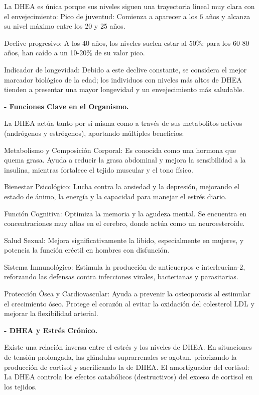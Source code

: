 \documentclass[
  spanish,
]{article}
\begin{document}
La DHEA es única porque sus niveles siguen una trayectoria lineal muy clara con el envejecimiento:
Pico de juventud: Comienza a aparecer a los 6 años y alcanza su nivel máximo entre los 20 y 25 años.

Declive progresivo: A los 40 años, los niveles suelen estar al 50\%; para los 60-80 años, han caído a un 10-20\% de su valor pico.

Indicador de longevidad: Debido a este declive constante, se considera el mejor marcador biológico de la edad; los individuos con niveles más altos de DHEA tienden a presentar una mayor longevidad y un envejecimiento más saludable.

\textbf{- Funciones Clave en el Organismo.}

La DHEA actúa tanto por sí misma como a través de sus metabolitos activos (andrógenos y estrógenos), aportando múltiples beneficios:

Metabolismo y Composición Corporal: Es conocida como una hormona que quema grasa. Ayuda a reducir la grasa abdominal y mejora la sensibilidad a la insulina, mientras fortalece el tejido muscular y el tono físico.

Bienestar Psicológico: Lucha contra la ansiedad y la depresión, mejorando el estado de ánimo, la energía y la capacidad para manejar el estrés diario.

Función Cognitiva: Optimiza la memoria y la agudeza mental. Se encuentra en concentraciones muy altas en el cerebro, donde actúa como un neuroesteroide.

Salud Sexual: Mejora significativamente la libido, especialmente en mujeres, y potencia la función eréctil en hombres con disfunción.

Sistema Inmunológico: Estimula la producción de anticuerpos e interleucina-2, reforzando las defensas contra infecciones virales, bacterianas y parasitarias.

Protección Ósea y Cardiovascular: Ayuda a prevenir la osteoporosis al estimular el crecimiento óseo. Protege el corazón al evitar la oxidación del colesterol LDL y mejorar la flexibilidad arterial.

\textbf{- DHEA y Estrés Crónico.}

Existe una relación inversa entre el estrés y los niveles de DHEA. En situaciones de tensión prolongada, las glándulas suprarrenales se agotan, priorizando la producción de cortisol y sacrificando la de DHEA.
El amortiguador del cortisol: La DHEA controla los efectos catabólicos (destructivos) del exceso de cortisol en los tejidos.
\end{document}
